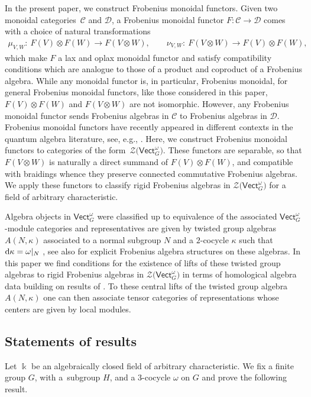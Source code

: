 \documentclass[10pt,a4paper]{amsart}
\numberwithin{equation}{section}
\newcommand{\deri}{{\rm d}}
\newcommand{\Vect}{\mathsf{Vect}}
\newcommand{\cC}{\mathcal{C}}
\newcommand{\cD}{\mathcal{D}}
\newcommand{\cZ}{\mathcal{Z}}
\begin{document}
In the present paper, we construct Frobenius monoidal functors. Given two monoidal cate\-gories~$\cC$ and $\cD$, a Frobenius monoidal functor $F\colon \cC\to \cD$ comes with a choice of natural transformations
\begin{gather*}
\mu_{V,W}\colon\ F(V)\otimes F(W)\to F(V\otimes W),\qquad
\nu_{V,W}\colon\ F(V\otimes W)\to F(V)\otimes F(W),
\end{gather*}
which make $F$ a lax and oplax monoidal functor and satisfy compatibility conditions which are analogue to those of a product and coproduct of a Frobenius algebra. While any monoidal functor is, in particular, Frobenius monoidal, for general Frobenius monoidal functors, like those considered in this paper, $F(V)\otimes F(W)$ and $F(V\otimes W)$ are not isomorphic. However, any Frobenius monoidal functor sends Frobenius algebras in $\cC$ to Frobenius algebras in $\cD$.
Frobenius monoidal functors have recently appeared in different contexts in the quantum algebra literature, see, e.g., \cite{FHL,WINART,Yad}. Here, we construct Frobenius monoidal functors to categories of the form~$\cZ\big(\Vect_G^\omega\big)$. These functors are separable, so that $F(V\otimes W)$ is naturally a direct summand of $F(V)\otimes F(W)$, and compatible with braidings whence they preserve connected commutative Frobenius algebras. We apply these functors to classify rigid Frobenius algebras in $\cZ\big(\Vect_G^\omega\big)$ for a field of arbitrary characteristic.

Algebra objects in $\Vect_G^\omega$ were classified up to equivalence of the associated $\Vect_G^\omega$-module categories and representatives are given by twisted group algebras $A(N,\kappa)$ associated to a normal subgroup $N$ and a $2$-cocycle $\kappa$ such that $\deri \kappa= \omega |_N$ \cite{Nat, Ost}, see also \cite{WINART} for explicit Frobenius algebra structures on these algebras. In this paper we find conditions for the existence of lifts of these twisted group algebras to rigid Frobenius algebras in $\cZ\big(\Vect_G^\omega\big)$ in terms of homological algebra data building on results of \cite{DS}. To these central lifts of the twisted group algebra $A(N,\kappa)$ one can then associate tensor categories of representations whose centers are given by local modules.

\subsection{Statements of results}

Let $\Bbbk$ be an algebraically closed field of arbitrary characteristic. We fix a finite group $G$, with a~subgroup $H$, and a $3$-cocycle $\omega$ on $G$ and prove the following result.
\end{document}

